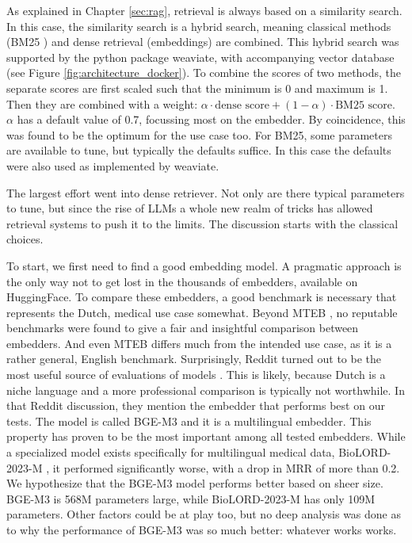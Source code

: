 As explained in Chapter \ref{sec:rag}, retrieval is always based on a similarity search. In this case, the similarity search is a hybrid search, meaning classical methods (BM25 \cite{robertson2009probabilistic}) and dense retrieval (embeddings) are combined. This hybrid search was supported by the python package weaviate, with accompanying vector database (see Figure \ref{fig:architecture_docker}). To combine the scores of two methods, the separate scores are first scaled such that the minimum is 0 and maximum is 1. Then they are combined with a weight: $\alpha \cdot \text{dense score} + (1-\alpha) \cdot \text{BM25 score}$. $\alpha$ has a default value of 0.7, focussing most on the embedder. By coincidence, this was found to be the optimum for the use case too. For BM25, some parameters are available to tune, but typically the defaults suffice. In this case the defaults were also used as implemented by weaviate.

The largest effort went into dense retriever. Not only are there typical parameters to tune, but since the rise of LLMs a whole new realm of tricks has allowed retrieval systems to push it to the limits. The discussion starts with the classical choices.

To start, we first need to find a good embedding model. A pragmatic approach is the only way not to get lost in the thousands of embedders, available on HuggingFace. To compare these embedders, a good benchmark is necessary that represents the Dutch, medical use case somewhat. Beyond MTEB \cite{muennighoff2022mteb}, no reputable benchmarks were found to give a fair and insightful comparison between embedders. And even MTEB differs much from the intended use case, as it is a rather general, English benchmark. Surprisingly, Reddit turned out to be the most useful source of evaluations of models \cite{reddit2025embedding}. This is likely, because Dutch is a niche language and a more professional comparison is typically not worthwhile. In that Reddit discussion, they mention the embedder that performs best on our tests. The model is called BGE-M3 and it is a multilingual embedder. This property has proven to be the most important among all tested embedders. While a specialized model exists specifically for multilingual medical data, BioLORD-2023-M \cite{remy2024biolord}, it performed significantly worse, with a drop in MRR of more than 0.2. We hypothesize that the BGE-M3 model performs better based on sheer size. BGE-M3 is 568M parameters large, while BioLORD-2023-M has only 109M parameters. Other factors could be at play too, but no deep analysis was done as to why the performance of BGE-M3 was so much better: whatever works works.


